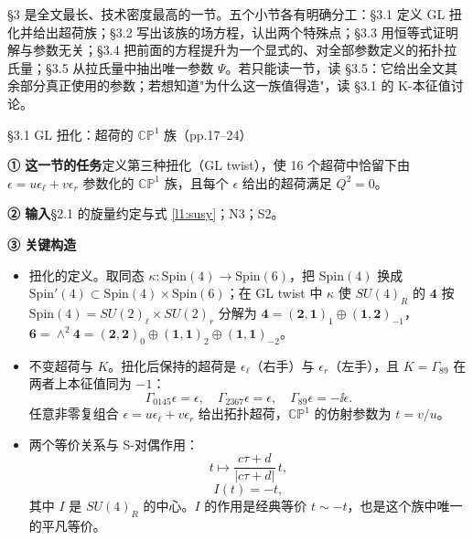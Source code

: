 \S3 是全文最长、技术密度最高的一节。五个小节各有明确分工：\S3.1 定义 GL 扭化并给出超荷族；\S3.2 写出该族的场方程，认出两个特殊点；\S3.3 用恒等式证明解与参数无关；\S3.4 把前面的方程提升为一个显式的、对全部参数定义的拓扑拉氏量；\S3.5 从拉氏量中抽出唯一参数 $\Psi$。若只能读一节，读 \S3.5：它给出全文其余部分真正使用的参数；若想知道"为什么这一族值得造"，读 \S3.1 的 K-本征值讨论。\pC

\begin{kcard}{§3.1 GL 扭化：超荷的 $\mathbb{CP}^1$ 族（pp.17--24）}

\noindent\textbf{① 这一节的任务}\quad 定义第三种扭化（GL twist），使 16 个超荷中恰留下由 $\epsilon=u\epsilon_\ell+v\epsilon_r$ 参数化的 $\mathbb{CP}^1$ 族，且每个 $\epsilon$ 给出的超荷满足 $Q^2=0$。\pA{}

\noindent\textbf{② 输入}\quad \S2.1 的旋量约定与式 \eqref{l1:susy}；N3；S2。

\noindent\textbf{③ 关键构造}\quad
\begin{itemize}
\item 扭化的定义。取同态 $\kappa:\mathrm{Spin}(4)\to\mathrm{Spin}(6)$，把 $\mathrm{Spin}(4)$ 换成 $\mathrm{Spin}'(4)\subset\mathrm{Spin}(4)\times\mathrm{Spin}(6)$；在 GL twist 中 $\kappa$ 使 $SU(4)_R$ 的 $\mathbf 4$ 按 $\mathrm{Spin}(4)=SU(2)_\ell\times SU(2)_r$ 分解为 $\mathbf 4=(\mathbf 2,\mathbf 1)_1\oplus(\mathbf 1,\mathbf 2)_{-1}$，$\mathbf 6=\wedge^2\mathbf 4=(\mathbf 2,\mathbf 2)_0\oplus(\mathbf 1,\mathbf 1)_2\oplus(\mathbf 1,\mathbf 1)_{-2}$。\pA{}
\item 不变超荷与 $K$。扭化后保持的超荷是 $\epsilon_\ell$（右手）与 $\epsilon_r$（左手），且 $K=\Gamma_{89}$ 在两者上本征值同为 $-1$：
\begin{equation}\label{l1:k89}\tag{3.11}
\Gamma_{0145}\epsilon=\epsilon,\quad \Gamma_{2367}\epsilon=\epsilon,\quad \Gamma_{89}\epsilon=-\ii\epsilon .
\end{equation}
任意非零复组合 $\epsilon=u\epsilon_\ell+v\epsilon_r$ 给出拓扑超荷，$\mathbb{CP}^1$ 的仿射参数为 $t=v/u$。\pA{}
\item 两个等价关系与 S-对偶作用：
\begin{equation}\label{l1:tact}\tag{3.13}
t\longmapsto\frac{c\tau+d}{|c\tau+d|}\,t ,
\end{equation}
\begin{equation}\label{l1:tneg}\tag{3.14}
I(t)=-t ,
\end{equation}
其中 $I$ 是 $SU(4)_R$ 的中心。$I$ 的作用是经典等价 $t\sim-t$，也是这个族中唯一的平凡等价。\pA{}
\end{itemize}


\end{kcard}
